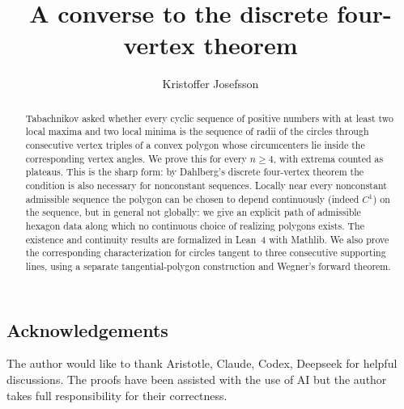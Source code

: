 \documentclass[11pt]{amsart}
\title{A converse to the discrete four-vertex theorem}
\author{Kristoffer Josefsson}
\date{\texttt{\gitversion}}
\theoremstyle{definition}
\theoremstyle{remark}
\begin{document}
\begin{abstract}
Tabachnikov asked whether every cyclic sequence of positive numbers with at
least two local maxima and two local minima is the sequence of radii of the
circles through consecutive vertex triples of a convex polygon whose
circumcenters lie inside the corresponding vertex angles. We prove this for
every $n\ge 4$, with extrema counted as plateaus. This is the sharp form: by
Dahlberg's discrete four-vertex theorem the condition is also necessary for
nonconstant sequences. Locally near every nonconstant admissible sequence the
polygon can be chosen to depend continuously (indeed $C^1$) on the sequence,
but in general not globally: we give an explicit path of admissible hexagon
data along which no continuous choice of realizing polygons exists. The
existence and continuity results are formalized in Lean~4 with Mathlib.
We also prove the corresponding characterization for circles tangent to three
consecutive supporting lines, using a separate tangential-polygon construction
and Wegner's forward theorem.
\end{abstract}

\maketitle










\subsection*{Acknowledgements}
The author would like to thank Aristotle, Claude, Codex, Deepseek for helpful
discussions. The proofs have been assisted with the use of AI but the author
takes full responsibility for their correctness.

\appendix





\end{document}
